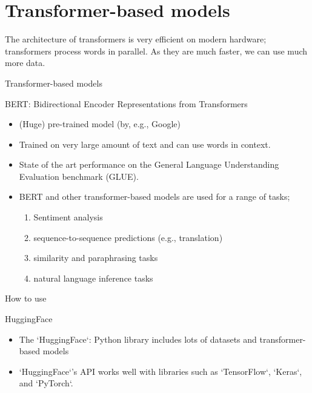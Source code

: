 \documentclass[compress]{beamer}
\begin{document}
\section{Transformer-based models}

\begin{frame}
	The architecture of transformers is very efficient on modern hardware; transformers process words in parallel.
	As they are much faster, we can use much more data. 
\end{frame}

\begin{frame}{Transformer-based models}
	\begin{block}{BERT: Bidirectional Encoder Representations from Transformers \parencite{BERT}}
		\begin{itemize}[<+->]
			\item (Huge) pre-trained model (by, e.g., Google) 
			\item Trained on very large amount of text and can use words in context. 
			\item State of the art performance on the General Language Understanding Evaluation benchmark (GLUE). 
			\item BERT and other transformer-based models are used for a range of tasks;
			\begin{enumerate}
				\item Sentiment analysis
				\item sequence-to-sequence predictions (e.g., translation)
				\item similarity and paraphrasing tasks
				\item natural language inference tasks
		\end{enumerate}
	\end{itemize}
	\end{block}
\end{frame}

\begin{frame}{How to use}
	\begin{block}{HuggingFace}
		\begin{itemize}[<+->]
			\item The `HuggingFace`: Python library includes lots of datasets and transformer-based models 
			\item `HuggingFace`'s API works well with libraries such as `TensorFlow`, `Keras`, and `PyTorch`. 
		\end{itemize}
	\end{block}
\end{frame}
\end{document}
